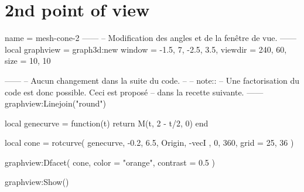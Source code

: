 \documentclass[varwidth, border = 3pt]{standalone}
\begin{document}
\section*{2nd point of view}

\begin{luadraw}{name = mesh-cone-2}
------
-- Modification des angles et de la fenêtre de vue.
------
local graphview = graph3d:new{
  window  = {-1.5, 7, -2.5, 3.5},
  viewdir = {240, 60},
  size    = {10, 10}
}

------
-- Aucun changement dans la suite du code.
--
-- note::
--     Une factorisation du code est donc possible. Ceci est proposé
--     dans la recette suivante.
------
graphview:Linejoin("round")

local genecurve = function(t)
  return M(t, 2 - t/2, 0)
end

local cone = rotcurve(
  genecurve,
  -0.2, 6.5,
  {
    Origin, -vecI
  },
  0, 360,
  {
    grid = {25, 36}
  })

graphview:Dfacet(
  cone,
  {
    color  = "orange",
    contrast = 0.5
  })

graphview:Show()
\end{luadraw}
\end{document}
